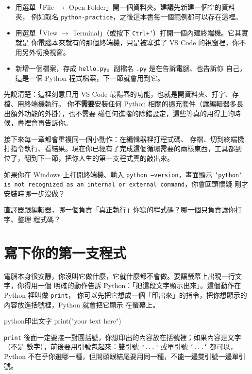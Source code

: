 \begin{itemize}
\item 用選單「File $\rightarrow$ Open Folder」開一個資料夾。建議先新建一個空的資料夾，
例如取名 \texttt{python-practice}，之後這本書每一個範例都可以存在這裡。
\item 用選單「View $\rightarrow$ Terminal」（或按下 \texttt{Ctrl+`}）打開一個內建終端機。它其實就是
你電腦本來就有的那個終端機，只是被塞進了 VS Code 的視窗裡，你不用另外切換視窗。
\item 新增一個檔案，存成 \texttt{hello.py}。副檔名 \texttt{.py} 是在告訴電腦、也告訴你
自己，這是一個 Python 程式檔案，下一節就會用到它。
\end{itemize}

先說清楚：這裡刻意只用 VS Code 最陽春的功能，也就是開資料夾、打字、存檔、用終端機執行。
你\textbf{不需要}安裝任何 Python 相關的擴充套件（讓編輯器多長出額外功能的外掛），也不需要
碰任何進階的除錯設定，這些等真的用得上的時候，書裡會再告訴你。

接下來每一章都會重複同一個小動作：在編輯器裡打程式碼、
存檔、切到終端機打指令執行、看結果。現在你已經有了完成這個循環需要的兩樣東西，工具都到
位了，翻到下一節，把你人生的第一支程式真的敲出來。

\begin{drills}[label=drills:setup]
\item 如果你在 Windows 上打開終端機、輸入 \texttt{python --version}，畫面顯示
\texttt{'python' is not recognized as an internal or external command}，你會回頭懷疑
剛才安裝時哪一步沒做？
\item 直譯器跟編輯器，哪一個負責「真正執行」你寫的程式碼？哪一個只負責讓你打字、整理
程式碼？
\end{drills}

\section{寫下你的第一支程式}
\label{sec:hello-world}

電腦本身很安靜，你沒叫它做什麼，它就什麼都不會做。要讓螢幕上出現一行文字，你得用一個
明確的動作告訴 Python：「把這段文字顯示出來」。這個動作在 Python 裡叫做 \texttt{print}，
你可以先把它想成一個「印出來」的指令，把你想顯示的內容放進括號裡，Python 就會把它顯示
在螢幕上。

\begin{code}{python}{印出文字}
print("your text here")
\end{code}

\texttt{print} 後面一定要接一對圓括號，你想印出的內容放在括號裡；如果內容是文字（不是
數字），前後要用引號包起來：雙引號 \texttt{"..."} 或單引號 \texttt{'...'} 都可以，
Python 不在乎你選哪一種，但開頭跟結尾要用同一種，不能一邊雙引號一邊單引號。

